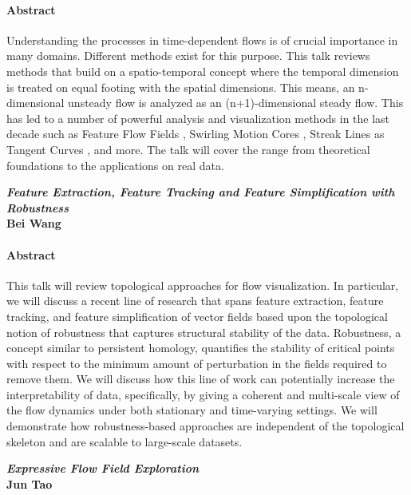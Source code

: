 \documentclass[preprint,journal]{vgtc}       %
\newcommand{\addverticalspace}{\vspace{3mm}}
\begin{document}
\paragraph{Abstract}
Understanding the processes in time-dependent flows is of crucial importance in many domains. Different methods exist for this purpose. This talk reviews methods that build on a spatio-temporal concept where the temporal dimension is treated on equal footing with the spatial dimensions. This means, an n-dimensional unsteady flow is analyzed as an (n+1)-dimensional steady flow. This has led to a number of powerful analysis and visualization methods in the last decade such as Feature Flow Fields \cite{theisel03b, weinkauf11b}, Swirling Motion Cores \cite{weinkauf07c}, Streak Lines as Tangent Curves \cite{weinkauf10c, weinkauf12a}, and more. The talk will cover the range from theoretical foundations to the applications on real data.

\addverticalspace

\noindent\textbf{\textit{Feature Extraction, Feature Tracking and Feature Simplification with Robustness}}\\
\textbf{Bei Wang}
\paragraph{Abstract}
This talk will review topological approaches for flow visualization. In particular, we will discuss a recent line of research that spans feature extraction, feature tracking, and feature simplification of vector fields based upon the topological notion of robustness that captures structural stability of the data. Robustness, a concept similar to persistent homology, quantifies the stability of critical points with respect to the minimum amount of
perturbation in the fields required to remove them. We will discuss how this line of work can potentially increase the interpretability of data, specifically, by giving a coherent and multi-scale view of the flow dynamics under both stationary and time-varying settings. We will demonstrate how robustness-based approaches are independent of the topological skeleton and are scalable to large-scale datasets.

\addverticalspace

\noindent\textbf{\textit{Expressive Flow Field Exploration}}\\
\textbf{Jun Tao}
\end{document}
